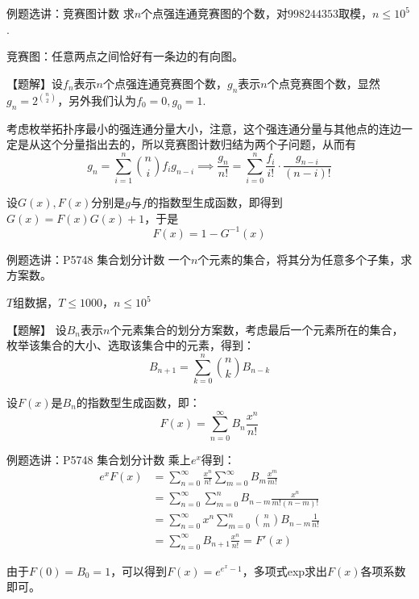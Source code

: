 \documentclass{beamer}
\begin{document}
\begin{frame}{例题选讲：竞赛图计数}
    \small
    求$n$个点强连通竞赛图的个数，对$998244353$取模，$n\leq 10^5$.

    \vspace{.5em}
    竞赛图：任意两点之间恰好有一条边的有向图。

    \vspace{1em}\pause
    【题解】设$f_n$表示$n$个点强连通竞赛图个数，$g_n$表示$n$个点竞赛图个数，显然$g_n=2^{\binom{n}{2}}$，另外我们认为$f_0=0,g_0=1$.

    \pause
    \vspace{.5em}
    考虑枚举拓扑序最小的强连通分量大小，注意，这个强连通分量与其他点的连边一定是从这个分量指出去的，所以竞赛图计数归结为两个子问题，从而有
    \begin{equation*}
        g_n=\sum_{i=1}^n \binom{n}{i} f_i g_{n-i} \implies \frac{g_n}{n!}=\sum_{i=0}^n \frac{f_i}{i!}\cdot \frac{g_{n-i}}{(n-i)!}
    \end{equation*}

    \pause
    \vspace{.5em}
    设$G(x),F(x)$分别是$g$与$f$的指数型生成函数，即得到$G(x)=F(x)G(x)+1$，于是
    \begin{equation*}
        F(x)=1-G^{-1}(x)
    \end{equation*}
\end{frame}

\begin{frame}{例题选讲：P5748 集合划分计数}
    \small
    一个$n$个元素的集合，将其分为任意多个子集，求方案数。

    $T$组数据，$T\leq 1000$，$n\leq 10^5$

    \vspace{1em}\pause
    【题解】 设$B_n$表示$n$个元素集合的划分方案数，考虑最后一个元素所在的集合，枚举该集合的大小、选取该集合中的元素，得到：
    \begin{equation*}
        B_{n+1}=\sum_{k=0}^{n}\binom{n}{k}B_{n-k}
    \end{equation*}

    \pause
    设$F(x)$是$B_n$的指数型生成函数，即：
    \begin{equation*}
        F(x)=\sum_{n= 0}^\infty B_n \frac{x^n}{n!}
    \end{equation*}
\end{frame}

\begin{frame}{例题选讲：P5748 集合划分计数}
    \small
    乘上$e^x$得到：
    \begin{align*}
        e^xF(x)&=\sum_{n= 0}^\infty \frac{x^n}{n!} \sum_{m= 0}^\infty B_m \frac{x^m}{m!}\\
        &= \sum_{n= 0}^\infty \sum_{m = 0}^n B_{n-m} \frac{x^n}{m!(n-m)!}\\
        &= \sum_{n= 0}^\infty x^n \sum_{m = 0}^n \binom{n}{m} B_{n-m} \frac{1}{n!}\\
        &= \sum_{n= 0}^\infty B_{n+1} \frac{x^n}{n!}= F'(x)
    \end{align*}

    \pause
    由于$F(0)=B_0=1$，可以得到$F(x)=e^{e^x-1}$，多项式exp求出$F(x)$各项系数即可。
\end{frame}
\end{document}
